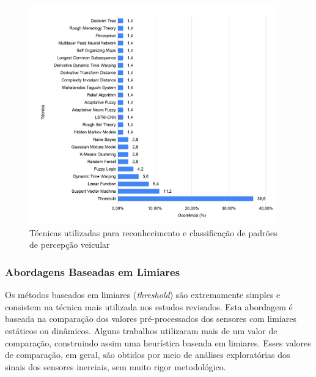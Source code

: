 \begin{figure}[h!]
  \centering
  \caption{Técnicas utilizadas para reconhecimento e classificação de padrões de percepção veicular}
   \label{fig:tecnicas_ocorrencia}
   \includegraphics[width=0.95\textwidth]{figuras/fig_19.png}
\end{figure}

\subsubsection{Abordagens Baseadas em Limiares} 

Os métodos baseados em limiares (\textit{threshold}) são extremamente simples e consistem na técnica mais utilizada nos estudos revisados. Esta abordagem é baseada na comparação dos valores pré-processados dos sensores com limiares estáticos ou dinâmicos. Alguns trabalhos utilizaram mais de um valor de comparação, construindo assim uma heurística baseada em limiares. Esses valores de comparação, em geral, são obtidos por meio de análises exploratórias dos sinais dos sensores inerciais, sem muito rigor metodológico.

